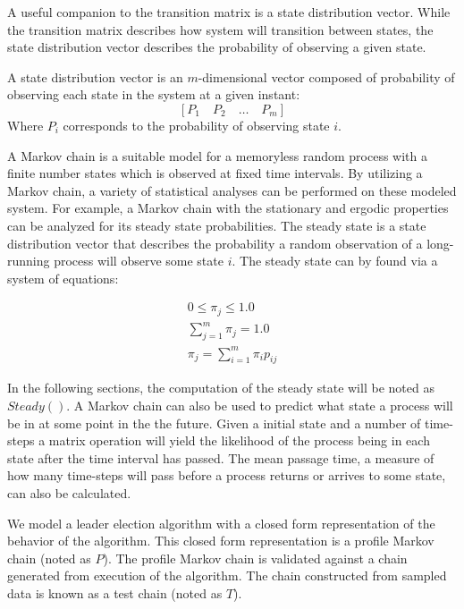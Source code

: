 A useful companion to the transition matrix is a state distribution vector.
While the transition matrix describes how system will transition between states, the state distribution vector describes the probability of observing a given state.
\begin{pdef}
A state distribution vector is an $m$-dimensional vector composed of probability of observing each state in the system at a given instant:
\[ [P_{1} \quad P_{2} \quad \ldots \quad P_{m} ] \]
Where $P_{i}$ corresponds to the probability of observing state $i$.
\end{pdef}

A Markov chain is a suitable model for a memoryless random process with a finite number states which is observed at fixed time intervals.
By utilizing a Markov chain, a variety of statistical analyses can be performed on these modeled system.
For example, a Markov chain with the stationary and ergodic properties can be analyzed for its steady state probabilities.
The steady state is a state distribution vector that describes the probability a random observation of a long-running process will observe some state $i$.
The steady state can by found via a system of equations: \cite{MARKOV3}

\begin{align}
0\leq\pi_j\leq1.0 \\
\sum_{j = 1}^{m}\pi_j = 1.0 \\
\pi_j = \sum_{i=1}^{m} \pi_i p_{ij}
\end{align}

In the following sections, the computation of the steady state will be noted as $Steady()$.
A Markov chain can also be used to predict what state a process will be in at some point in the the future.
Given a initial state and a number of time-steps a matrix operation will yield the likelihood of the process being in each state after the time interval has passed.
The mean passage time, a measure of how many time-steps will pass before a process returns or arrives to some state, can also be calculated.

We model a leader election algorithm with a closed form representation of the behavior of the algorithm.
This closed form representation is a profile Markov chain (noted as $P$).
The profile Markov chain is validated against a chain generated from execution of the algorithm.
The chain constructed from sampled data is known as a test chain (noted as $T$).
